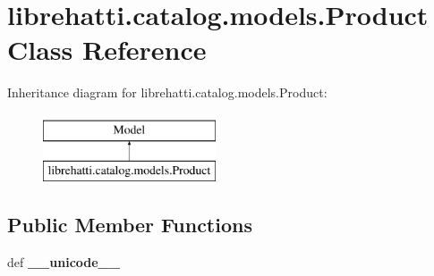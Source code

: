 \hypertarget{classlibrehatti_1_1catalog_1_1models_1_1Product}{\section{librehatti.\-catalog.\-models.\-Product Class Reference}
\label{classlibrehatti_1_1catalog_1_1models_1_1Product}
}
Inheritance diagram for librehatti.\-catalog.\-models.\-Product\-:\begin{figure}[H]
\begin{center}
\leavevmode
\includegraphics[height=2.000000cm]{classlibrehatti_1_1catalog_1_1models_1_1Product}
\end{center}
\end{figure}
\subsection*{Public Member Functions}
\begin{DoxyCompactItemize}
\item 
\hypertarget{classlibrehatti_1_1catalog_1_1models_1_1Product_a91388ae14c28db01a8a1bc32edb90d87}{def {\bfseries \-\_\-\-\_\-unicode\-\_\-\-\_\-}}\label{classlibrehatti_1_1catalog_1_1models_1_1Product_a91388ae14c28db01a8a1bc32edb90d87}

\end{DoxyCompactItemize}
